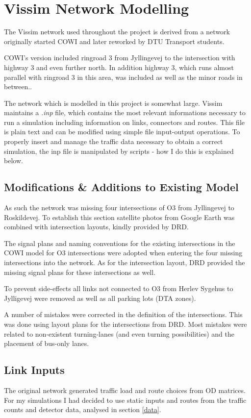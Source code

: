\section{Vissim Network Modelling}
\label{modelling}
The Vissim network used throughout the project is derived from a network originally started COWI and later reworked by DTU Transport students.

COWI's version included ringroad 3 from Jyllingevej to the intersection with highway 3 and even further north. In addition highway 3, which runs almost parallel with ringroad 3 in this area, was included as well as the minor roads in between..

The network which is modelled in this project is somewhat large. Vissim maintains a \textit{.inp} file, which contains the most relevant informations necessary to run a simulation including information on links, connectors and routes. This file is plain text and can be modified using simple file input-output operations. To properly insert and manage the traffic data necessary to obtain a correct simulation, the inp file is manipulated by scripts - how I do this is explained below.

\subsection{Modifications \& Additions to Existing Model}

As such the network was missing four intersections of O3 from Jyllingevej to Roskildevej. To establish this section satellite photos from Google Earth was combined with intersection layouts, kindly provided by DRD.

The signal plans and naming conventions for the existing intersections in the COWI model for O3 intersections were adopted when entering the four missing intersections into the network. As for the intersection layout, DRD provided the missing signal plans for these intersections as well.

To prevent side-effects all links not connected to O3 from Herlev Sygehus to Jylligevej were removed as well as all parking lots (DTA zones).

A number of mistakes were corrected in the definition of the intersections. This was done using layout plans for the intersections from DRD. Most mistakes were related to non-existent turning-lanes (and even turning possibilities) and the placement of bus-only lanes. 

\subsection{Link Inputs}
The original network generated traffic load and route choices from OD matrices. For my simulations I had decided to use static inputs and routes from the traffic counts and detector data, analysed in section \ref{data}. 

